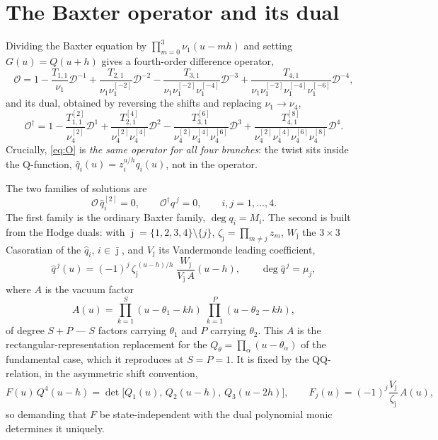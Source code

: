 \documentclass[11pt]{article}
\newcommand{\Ddet}{\mathcal{D}}
\newcommand{\Op}{\mathcal{O}}
\newcommand{\qh}{\hat q}
\newcommand{\shift}[1]{^{[#1]}}
\begin{document}
\section{The Baxter operator and its dual}

Dividing the Baxter equation by $\prod_{m=0}^{3}\nu_1(u-mh)$ and setting $G(u)=Q(u+h)$ gives a
fourth-order difference operator,
\begin{equation}
\Op = 1 - \frac{T_{1,1}}{\nu_1}\Ddet^{-1}
        + \frac{T_{2,1}}{\nu_1\nu_1\shift{-2}}\Ddet^{-2}
        - \frac{T_{3,1}}{\nu_1\nu_1\shift{-2}\nu_1\shift{-4}}\Ddet^{-3}
        + \frac{T_{4,1}}{\nu_1\nu_1\shift{-2}\nu_1\shift{-4}\nu_1\shift{-6}}\Ddet^{-4} ,
\label{eq:O}
\end{equation}
and its dual, obtained by reversing the shifts and replacing $\nu_1 \to \nu_4$,
\begin{equation}
\Op^\dagger = 1 - \frac{T_{1,1}\shift{2}}{\nu_4\shift{2}}\Ddet^{1}
        + \frac{T_{2,1}\shift{4}}{\nu_4\shift{2}\nu_4\shift{4}}\Ddet^{2}
        - \frac{T_{3,1}\shift{6}}{\nu_4\shift{2}\nu_4\shift{4}\nu_4\shift{6}}\Ddet^{3}
        + \frac{T_{4,1}\shift{8}}{\nu_4\shift{2}\nu_4\shift{4}\nu_4\shift{6}\nu_4\shift{8}}\Ddet^{4} .
\label{eq:Odag}
\end{equation}
Crucially, \eqref{eq:O} is \emph{the same operator for all four branches}: the twist sits inside the
Q-function, $\qh_i(u) = z_i^{u/h}q_i(u)$, not in the operator.

The two families of solutions are
\begin{equation}
\Op\,\qh_i\shift{2} = 0 , \qquad \Op^\dagger \qh^{\,j} = 0 , \qquad i,j = 1,\dots,4 .
\label{eq:twofamilies}
\end{equation}
The first family is the ordinary Baxter family, $\deg q_i = M_i$. The second is built from the
Hodge duals: with $\bar\jmath = \{1,2,3,4\}\setminus\{j\}$, $\zeta_{\bar\jmath} = \prod_{m\neq j}z_m$,
$W_{\bar\jmath}$ the $3\times 3$ Casoratian of the $\qh_i$, $i \in \bar\jmath$, and
$V_{\bar\jmath}$ its Vandermonde leading coefficient,
\begin{equation}
\qh^{\,j}(u) = (-1)^j\,\zeta_{\bar\jmath}^{\,(u-h)/h}\;
\frac{W_{\bar\jmath}}{V_{\bar\jmath}\,A}(u-h) , \qquad \deg \qh^{\,j} = \mu_j ,
\label{eq:dual}
\end{equation}
where $A$ is the vacuum factor
\begin{equation}
A(u) = \prod_{k=1}^{S}(u-\theta_1-kh)\;\prod_{k=1}^{P}(u-\theta_2-kh) ,
\label{eq:A}
\end{equation}
of degree $S+P$ --- $S$ factors carrying $\theta_1$ and $P$ carrying $\theta_2$. This $A$ is the
rectangular-representation replacement for the $Q_\theta = \prod_\alpha(u-\theta_\alpha)$ of the
fundamental case, which it reproduces at $S=P=1$. It is fixed by the QQ-relation, in the
asymmetric shift convention,
\begin{equation}
F(u)\,Q^4(u-h) = \det\big[Q_1(u),\,Q_2(u-h),\,Q_3(u-2h)\big] ,
\qquad F_j(u) = (-1)^j \frac{V_{\bar\jmath}}{\zeta_{\bar\jmath}}\,A(u) ,
\label{eq:QQ}
\end{equation}
so demanding that $F$ be state-independent with the dual polynomial monic determines it uniquely.
\end{document}
